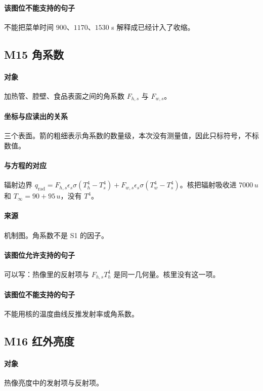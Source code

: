 \paragraph{该图位不能支持的句子}
不能把菜单时间 $900$、$1170$、$1530$ s 解释成已经计入了收缩。

\subsection{M15 角系数}
\paragraph{对象}
加热管、腔壁、食品表面之间的角系数 $F_{h,s}$ 与 $F_{w,s}$。

\paragraph{坐标与应读出的关系}
三个表面。箭的粗细表示角系数的数量级，本次没有测量值，因此只标符号，不标数值。

\paragraph{与方程的对应}
辐射边界 $q_{\mathrm{rad}}=F_{h,s}\epsilon_s\sigma(T_h^4-T_s^4)+F_{w,s}\epsilon_s\sigma(T_w^4-T_s^4)$。核把辐射吸收进 $7000\,u$ 和 $T_\infty=90+95\,u$，没有 $T^4$。

\paragraph{来源}
机制图。角系数不是 S1 的因子。

\paragraph{该图位允许支持的句子}
可以写：热像里的反射项与 $F_{h,s}T_h^4$ 是同一几何量。核里没有这一项。

\paragraph{该图位不能支持的句子}
不能用核的温度曲线反推发射率或角系数。

\subsection{M16 红外亮度}
\paragraph{对象}
热像亮度中的发射项与反射项。

